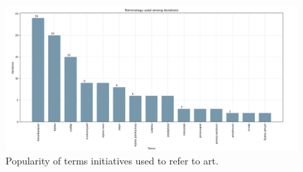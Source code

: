 \begin{figure}
    \centering
    \includegraphics[width=\textwidth]{chapters/1-state_of_the_art/image/plot01-art-terms.png}
    \caption{Popularity of terms initiatives used to refer to art.}
    \label{fig:c1-terms_popularity}
\end{figure}

